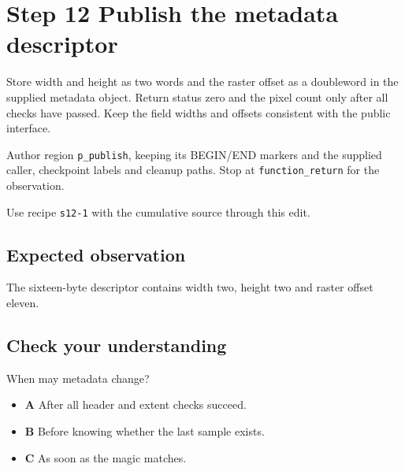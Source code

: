 \section{Step 12 Publish the metadata descriptor}\label{ppm-s12}

Store width and height as two words and the raster offset as a doubleword in the supplied metadata object. Return status zero and the pixel count only after all checks have passed. Keep the field widths and offsets consistent with the public interface.

Author region \texttt{p\_publish}, keeping its BEGIN/END markers and the supplied caller, checkpoint labels and cleanup paths. Stop at \texttt{function\_return} for the observation.

Use recipe \texttt{s12-1} with the cumulative source through this edit.

\subsection{Expected observation}
The sixteen-byte descriptor contains width two, height two and raster offset eleven.

\subsection{Check your understanding}
When may metadata change?

\begin{itemize}
\item \textbf{A} After all header and extent checks succeed.
\item \textbf{B} Before knowing whether the last sample exists.
\item \textbf{C} As soon as the magic matches.
\end{itemize}
